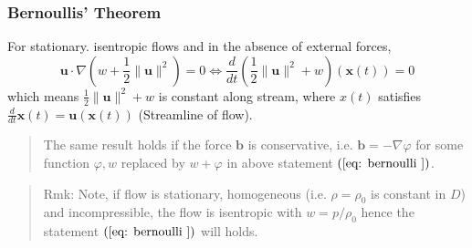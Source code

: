 \subsubsection{Bernoullis' Theorem} %

For stationary. isentropic flows and in the absence of external forces,
\begin{equation}
\textbf{u} \cdot \nabla \left(w + \frac{1}{2}\lVert\textbf{u}\rVert^2\right) = 0
\Leftrightarrow
\frac{d}{dt}\left(\frac{1}{2}\lVert\textbf{u}\rVert^2+w\right)(\textbf{x}(t)) = 0
\label{eq: bernoulli }
\end{equation}
which means $\displaystyle \frac{1}{2}\lVert\textbf{u}\rVert^2 + w$ is constant along stream, where $x(t)$ satisfies $\displaystyle \frac{d}{dt}\textbf{x}(t) = \textbf{u}(\textbf{x}(t))$ (Streamline of flow).

\begin{quote}
	The same result holds if the force $\textbf{b}$ is conservative, i.e. $\textbf{b}=-\nabla \varphi$ for some function $\varphi, w$ replaced by $w+\varphi$ in above statement $(\ref{eq: bernoulli })$.
\end{quote}

\begin{quote}
	Rmk:
Note, if flow is stationary, homogeneous (i.e. $\rho = \rho_0$ is constant in $D$)  and incompressible, the flow is isentropic with $w=p/\rho_0$ hence the statement $(\ref{eq: bernoulli })$ will holds.
\end{quote}


